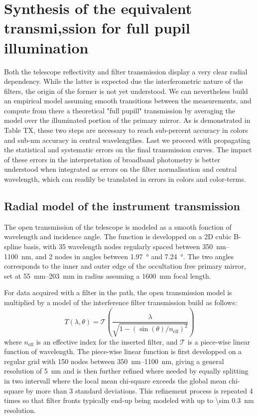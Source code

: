 \section{Synthesis of the equivalent transmi,ssion for full pupil illumination}
\label{sec:discussion}

Both the telescope reflectivity and filter transmission display a very
clear radial dependency. While the latter is expected due the
interferometric nature of the filters, the origin of the former is not
yet understood. We can nevertheless build an empirical model assuming
smooth transitions between the measurements, and compute from there a
theoretical "full pupill" transmission by averaging the model over the
illuminated portion of the primary mirror. As is demonstrated in Table
TX, these two steps are necessary to reach sub-percent accuracy in
colors and sub-nm accuracy in central wavelengthes. Last we proceed
with propagating the statistical and systematic errors on the final
transmission curves. The impact of these errors in the interpretation
of broadband photometry is better understood when integrated as errors
on the filter normalisation and central wavelength, which can readily
be translated in errors in colors and color-terms.


\subsection{Radial model of the instrument transmission}
\label{sec:model}

The open transmission of the telescope is modeled as a smooth fonction
of wavelength and incidence angle. The function is developped on a 2D
cubic B-spline basis, with \num{35} wavelength nodes regularly spaced
between \SIrange{350}{1100}{nm}, and 2 nodes in angles between
\SI{1.97}{\degree} and \SI{7.24}{\degree}. The two angles corresponds
to the inner and outer edge of the occultation free primary mirror,
set at \SIrange{55}{203}{mm} in radius assuming a \SI{1600}{mm} focal
length.

For data acquired with a filter in the path, the open transmission
model is multiplied by a model of the interference filter transmission
build as follows:
\begin{equation}
  \label{eq:filtertransmission}
T(\lambda, \theta) = \mathcal T\left(\frac{\lambda}{\sqrt{1 -
    (\sin(\theta) / n_\text{eff})^2}}\right)
\end{equation}
where $n_\text{eff}$ is an effective index for the inserted filter,
and $\mathcal T$ is a piece-wise linear function of wavelength. The
piece-wise linear function is first developped on a regular grid with
\num{150} nodes between \SIrange{350}{1100}{nm}, giving a general
resolution of \SI{5}{nm} and is then further refined where needed by
equally splitting in two intervall where the local mean chi-square
exceeds the global mean chi-square by more than $3$ standard
deviations. This refinement process is repeated \num{4} times so that
filter fronts typically end-up being modeled with up to \SI{\sim
  0.3}{nm} resolution.

